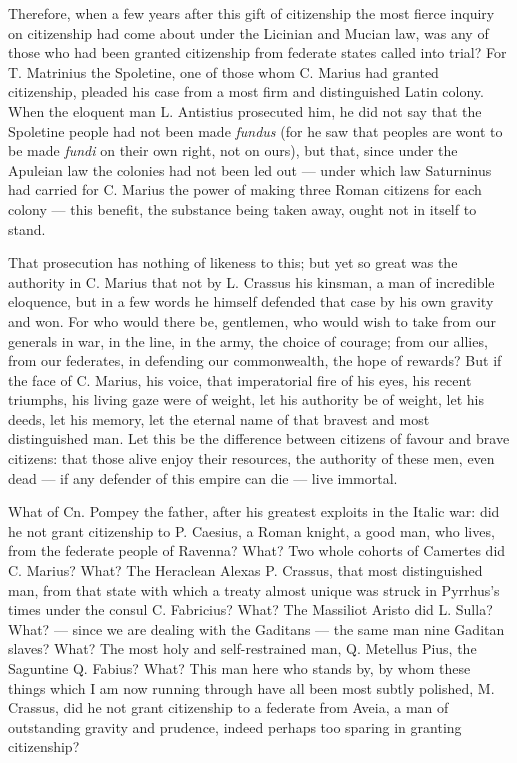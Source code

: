  Therefore, when a few years after this gift of citizenship the most fierce inquiry on citizenship had come about under the Licinian and Mucian law, was any of those who had been granted citizenship from federate states called into trial? For T. Matrinius the Spoletine, one of those whom C. Marius had granted citizenship, pleaded his case from a most firm and distinguished Latin colony. When the eloquent man L. Antistius prosecuted him, he did not say that the Spoletine people had not been made \textit{fundus} (for he saw that peoples are wont to be made \textit{fundi} on their own right, not on ours), but that, since under the Apuleian law the colonies had not been led out --- under which law Saturninus had carried for C. Marius the power of making three Roman citizens for each colony --- this benefit, the substance being taken away, ought not in itself to stand.

 That prosecution has nothing of likeness to this; but yet so great was the authority in C. Marius that not by L. Crassus his kinsman, a man of incredible eloquence, but in a few words he himself defended that case by his own gravity and won. For who would there be, gentlemen, who would wish to take from our generals in war, in the line, in the army, the choice of courage; from our allies, from our federates, in defending our commonwealth, the hope of rewards? But if the face of C. Marius, his voice, that imperatorial fire of his eyes, his recent triumphs, his living gaze were of weight, let his authority be of weight, let his deeds, let his memory, let the eternal name of that bravest and most distinguished man. Let this be the difference between citizens of favour and brave citizens: that those alive enjoy their resources, the authority of these men, even dead --- if any defender of this empire can die --- live immortal.

 What of Cn. Pompey the father, after his greatest exploits in the Italic war: did he not grant citizenship to P. Caesius, a Roman knight, a good man, who lives, from the federate people of Ravenna? What? Two whole cohorts of Camertes did C. Marius? What? The Heraclean Alexas P. Crassus, that most distinguished man, from that state with which a treaty almost unique was struck in Pyrrhus's times under the consul C. Fabricius? What? The Massiliot Aristo did L. Sulla? What? --- since we are dealing with the Gaditans --- the same man nine Gaditan slaves? What? The most holy and self-restrained man, Q. Metellus Pius, the Saguntine Q. Fabius? What? This man here who stands by, by whom these things which I am now running through have all been most subtly polished, M. Crassus, did he not grant citizenship to a federate from Aveia, a man of outstanding gravity and prudence, indeed perhaps too sparing in granting citizenship?

